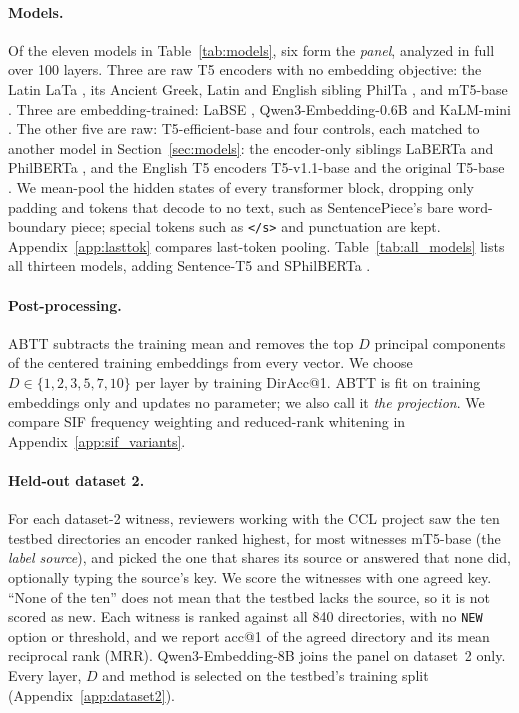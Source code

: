 \documentclass[11pt]{article}
\begin{document}
\paragraph{Models.}
Of the eleven models in Table~\ref{tab:models}, six form the \emph{panel}, analyzed in full over 100 layers.
Three are raw T5 encoders with no embedding objective: the Latin LaTa \citep{lata2023card}, its Ancient Greek, Latin and English sibling PhilTa \citep{riemenschneider2023lata}, and mT5-base \citep{xue2021mt5}.
Three are embedding-trained: LaBSE \citep{feng2022labse}, Qwen3-Embedding-0.6B \citep[Qwen3-0.6B;][]{qwen3embedding2025} and KaLM-mini \citep{kalm2025embedding}.
The other five are raw: T5-efficient-base and four controls, each matched to another model in Section~\ref{sec:models}: the encoder-only siblings LaBERTa \citep{laberta2023card} and PhilBERTa \citep{riemenschneider2023lata}, and the English T5 encoders T5-v1.1-base \citep{t5v11release} and the original T5-base \citep{raffel2020t5}.
We mean-pool the hidden states of every transformer block, dropping only padding and tokens that decode to no text, such as SentencePiece's bare word-boundary piece; special tokens such as \texttt{</s>} and punctuation are kept.
Appendix~\ref{app:lasttok} compares last-token pooling.
Table~\ref{tab:all_models} lists all thirteen models, adding Sentence-T5 \citep{ni2022sentencet5} and SPhilBERTa \citep{riemenschneider2023sphilberta}.

\paragraph{Post-processing.}
\label{sec:postproc}
ABTT \citep{mu2018allbutthetop} subtracts the training mean and removes the top $D$ principal components of the centered training embeddings from every vector.
We choose $D \in \{1,2,3,5,7,10\}$ per layer by training DirAcc@1.
ABTT is fit on training embeddings only and updates no parameter; we also call it \emph{the projection}.
We compare SIF frequency weighting \citep{arora2017sif} and reduced-rank whitening \citep{su2021whitening} in Appendix~\ref{app:sif_variants}.

\paragraph{Held-out dataset 2.}
\label{sec:dataset2}
For each dataset-2 witness, reviewers working with the CCL project saw the ten testbed directories an encoder ranked highest, for most witnesses mT5-base (the \emph{label source}), and picked the one that shares its source or answered that none did, optionally typing the source's key.
We score the witnesses with one agreed key.
``None of the ten'' does not mean that the testbed lacks the source, so it is not scored as new.
Each witness is ranked against all 840 directories, with no \texttt{NEW} option or threshold, and we report acc@1 of the agreed directory and its mean reciprocal rank (MRR).
Qwen3-Embedding-8B \citep[Qwen3-8B;][]{qwen3embedding2025} joins the panel on dataset~2 only.
Every layer, $D$ and method is selected on the testbed's training split (Appendix~\ref{app:dataset2}).
\end{document}
